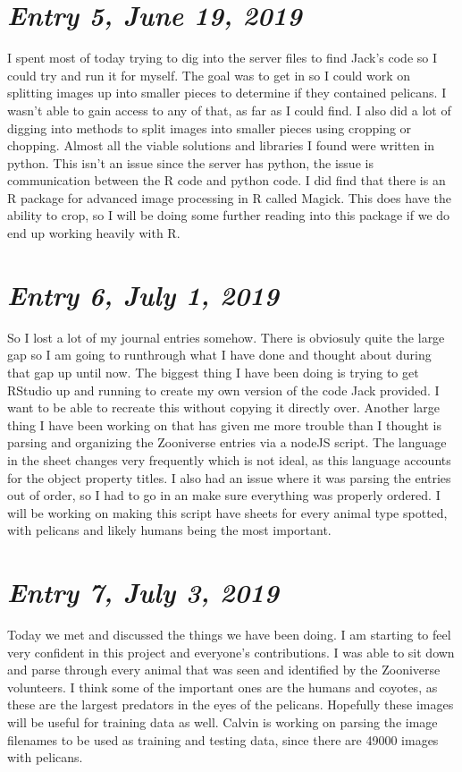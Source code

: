 \documentclass{article}
\begin{document}
\section{\Large \itshape Entry 5, June 19, 2019}
	I spent most of today trying to dig into the server files to find Jack's code so I could try and run it for myself.
The goal was to get in so I could work on splitting images up into smaller pieces to determine if they contained pelicans. I wasn't able to gain access to any of that, as far as I could find.
I also did a lot of digging into methods to split images into smaller pieces using cropping or chopping. Almost all the viable solutions and libraries I found were written in python. This isn't an issue since the server has python, the issue is communication between the R code and python code.
I did find that there is an R package for advanced image processing in R called Magick. This does have the ability to crop, so I will be doing some further reading into this package if we do end up working heavily with R.

\section{\Large \itshape Entry 6, July 1, 2019}
So I lost a lot of my journal entries somehow. There is obviosuly quite the large gap so I am going to runthrough what I have done and thought about during that gap up until now.
The biggest thing I have been doing is trying to get RStudio up and running to create my own version of the code Jack provided. I want to be able to recreate this without copying it directly over.
\newline
Another large thing I have been working on that has given me more trouble than I thought is parsing and organizing the Zooniverse entries via a nodeJS script. The language in the sheet changes very frequently which is not ideal, as this language accounts for the object property titles. I also had an issue where it was parsing the entries out of order, so I had to go in an make sure everything was properly ordered. I will be working on making this script have sheets for every animal type spotted, with pelicans and likely humans being the most important.

\section{\Large \itshape Entry 7, July 3, 2019}
Today we met and discussed the things we have been doing. I am starting to feel very confident in this project and everyone's contributions. I was able to sit down and parse through every animal that was seen and identified by the Zooniverse volunteers. I think some of the important ones are the humans and coyotes, as these are the largest predators in the eyes of the pelicans. Hopefully these images will be useful for training data as well. Calvin is working on parsing the image filenames to be used as training and testing data, since there are 49000 images with pelicans.
\end{document}
